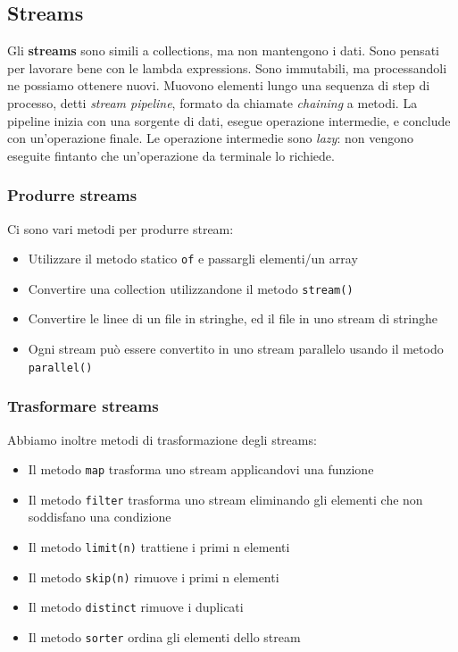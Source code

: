 \documentclass[11pt]{article}
\newcommand{\code}[1]{\texttt{#1}}
\begin{document}
\subsection{Streams}
Gli \textbf{streams} sono simili a collections, ma non mantengono i dati. Sono pensati per lavorare bene con le lambda expressions. Sono immutabili, ma processandoli ne possiamo ottenere nuovi. Muovono elementi lungo una sequenza di step di processo, detti \textit{stream pipeline}, formato da chiamate \textit{chaining} a metodi. La pipeline inizia con una sorgente di dati, esegue operazione intermedie, e conclude con un'operazione finale. Le operazione intermedie sono \textit{lazy}: non vengono eseguite fintanto che un'operazione da terminale lo richiede.
\subsubsection{Produrre streams}
Ci sono vari metodi per produrre stream:
\begin{itemize}
    \item Utilizzare il metodo statico \code{of} e passargli elementi/un array
    \item Convertire una collection utilizzandone il metodo \code{stream()}
    \item Convertire le linee di un file in stringhe, ed il file in uno stream di stringhe
    \item Ogni stream può essere convertito in uno stream parallelo usando il metodo \code{parallel()}
\end{itemize}
\subsubsection{Trasformare streams}
Abbiamo inoltre metodi di trasformazione degli streams:
\begin{itemize}
    \item Il metodo \code{map} trasforma uno stream applicandovi una funzione 
    \item Il metodo \code{filter} trasforma uno stream eliminando gli elementi che non soddisfano una condizione
    \item Il metodo \code{limit(n)} trattiene i primi n elementi
    \item Il metodo \code{skip(n)} rimuove i primi n elementi
    \item Il metodo \code{distinct} rimuove i duplicati 
    \item Il metodo \code{sorter} ordina gli elementi dello stream 
\end{itemize}
\end{document}
